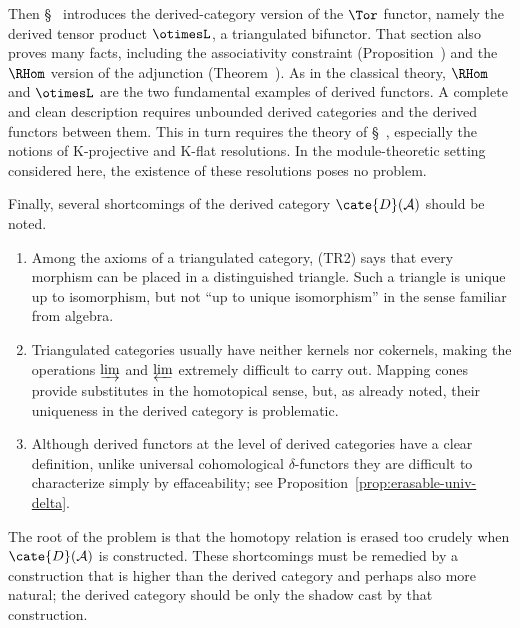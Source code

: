 Then \S~ introduces the derived-category
version of the $\Tor$ functor, namely the derived tensor product $\otimesL$,
a triangulated bifunctor. That section also proves many facts, including the
associativity constraint
(Proposition~) and the $\RHom$ version of the adjunction
(Theorem~). As in
the classical theory, $\RHom$ and $\otimesL$ are the two fundamental examples
of derived functors. A complete and clean description requires unbounded
derived categories and the derived functors between them. This in turn
requires the theory of
\S~, especially the notions of
K-projective and K-flat resolutions. In the module-theoretic setting
considered here, the existence of these resolutions poses no problem.

Finally, several shortcomings of the derived category
$\cate{D}(\mathcal{A})$ should be noted.
\begin{enumerate}
	\item Among the axioms of a triangulated category, (TR2) says that every
	morphism can be placed in a distinguished triangle. Such a triangle is
	unique up to isomorphism, but not “up to unique isomorphism” in the sense
	familiar from algebra.
	\item Triangulated categories usually have neither kernels nor cokernels,
	making the operations $\varinjlim$ and $\varprojlim$ extremely difficult
	to carry out. Mapping cones provide substitutes in the homotopical sense,
	but, as already noted, their uniqueness in the derived category is
	problematic.
	\item Although derived functors at the level of derived categories have a
	clear definition, unlike universal cohomological $\delta$-functors they
	are difficult to characterize simply by effaceability; see
	Proposition~\ref{prop:erasable-univ-delta}.
\end{enumerate}

The root of the problem is that the homotopy relation is erased too crudely
when $\cate{D}(\mathcal{A})$ is constructed. These shortcomings must be
remedied by a construction that is higher than the derived category and
perhaps also more natural; the derived category should be only the shadow
cast by that construction.

